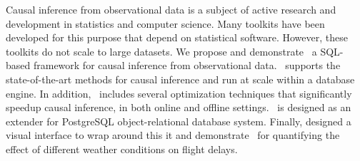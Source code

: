 Causal inference from observational data is a subject of active research and development in statistics and computer science. Many toolkits have been developed for this purpose that depend on statistical software.
However, these toolkits do not scale to large datasets.
We propose and demonstrate \GSQL\ a SQL-based framework for causal inference from observational data.
\GSQL\ supports the state-of-the-art methods for causal inference and run at scale within a database engine.
In addition, \GSQL\ includes several optimization techniques that significantly speedup causal inference, in both online and offline settings. \GSQL\ is designed as an extender for PostgreSQL object-relational database system. Finally,  designed a visual interface to wrap around this it and demonstrate \GSQL\ for quantifying the effect of different weather conditions on flight delays. 